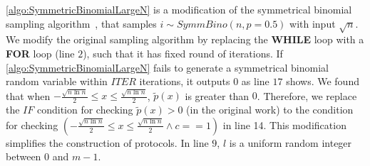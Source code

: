 \autoref{algo:SymmetricBinomialLargeN} is a modification of the symmetrical binomial sampling algorithm~\cite{googleDP2019}, that samples $i\sim SymmBino\left(n,p=0.5\right) $ with input $\sqrt{n}$. We modify the original sampling algorithm by replacing the \textbf{WHILE} loop with a \textbf{FOR} loop (line $2$), such that it has fixed round of iterations. If \autoref{algo:SymmetricBinomialLargeN} fails to generate a symmetrical binomial random variable within $ITER$ iterations, it outputs $0$ as line $17$ shows. We found that when $-\frac{\sqrt{n\ln n}}{2} \leq x \leq \frac{\sqrt{n\ln n}}{2}$, $\tilde{p}\left(x\right)$ is greater than $0$. Therefore, we replace the $IF$ condition for checking $\tilde{p}\left(x\right)>0$ (in the original work) to the condition for checking $\left(-\frac{\sqrt{n\ln n}}{2} \leq x \leq \frac{\sqrt{n\ln n}}{2} \land c==1\right) $ in line 14. This modification simplifies the construction of \smpc protocols. In line $9$, $l$ is a uniform random integer between $0$ and $m-1$.



